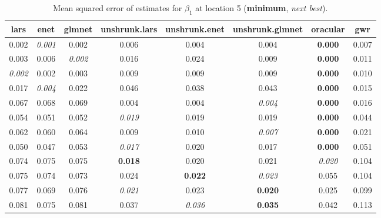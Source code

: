 \documentclass[authoryear, review, 11pt]{elsarticle}
\begin{document}
		\begin{table}[ht]
		\begin{center}
		\begin{tabular}{cccccccc}
		 lars & enet & glmnet & unshrunk.lars & unshrunk.enet & unshrunk.glmnet & oracular & gwr \\ 
		  \hline
		0.002 & \emph{0.001} & 0.002 & 0.006 & 0.004 & 0.004 & \textbf{0.000} & 0.007 \\ 
		  0.003 & 0.006 & \emph{0.002} & 0.016 & 0.024 & 0.009 & \textbf{0.000} & 0.011 \\ 
		  \emph{0.002} & 0.002 & 0.003 & 0.009 & 0.009 & 0.009 & \textbf{0.000} & 0.010 \\ 
		  0.017 & \emph{0.004} & 0.022 & 0.046 & 0.038 & 0.043 & \textbf{0.000} & 0.015 \\ 
		  0.067 & 0.068 & 0.069 & 0.004 & 0.004 & \emph{0.004} & \textbf{0.000} & 0.016 \\ 
		  0.054 & 0.051 & 0.052 & \emph{0.019} & 0.019 & 0.019 & \textbf{0.000} & 0.044 \\ 
		  0.062 & 0.060 & 0.064 & 0.009 & 0.010 & \emph{0.007} & \textbf{0.000} & 0.021 \\ 
		  0.050 & 0.047 & 0.053 & \emph{0.017} & 0.020 & 0.017 & \textbf{0.000} & 0.051 \\ 
		  0.074 & 0.075 & 0.075 & \textbf{0.018} & 0.020 & 0.021 & \emph{0.020} & 0.104 \\ 
		  0.075 & 0.074 & 0.073 & 0.024 & \textbf{0.022} & \emph{0.023} & 0.055 & 0.104 \\ 
		  0.077 & 0.069 & 0.076 & \emph{0.021} & 0.023 & \textbf{0.020} & 0.025 & 0.099 \\ 
		  0.081 & 0.075 & 0.081 & 0.037 & \emph{0.036} & \textbf{0.035} & 0.042 & 0.113 \\ 
		  \end{tabular}
		\caption{Mean squared error of estimates for $\beta_1$ at location 5 (\textbf{minimum}, \emph{next best}).\label{loc5-X1-MSEX}}
		\end{center}
		\end{table}



	
\end{document}

